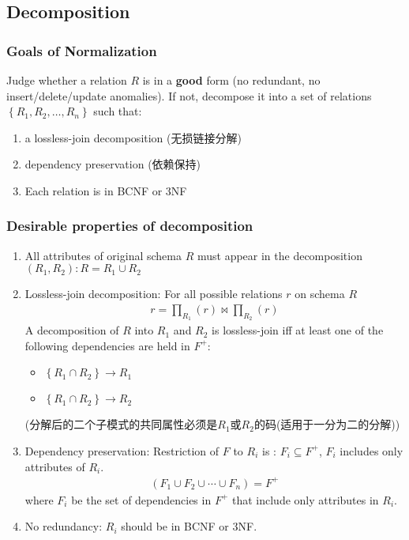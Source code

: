 \subsection{Decomposition}

\subsubsection{Goals of Normalization}
Judge whether a relation $R$ is in a \textbf{good} form (no redundant, no insert/delete/update anomalies). If not, decompose it into a set of relations $\left\{ R_1, R_2, \dots, R_n \right\}$ such that: 
\begin{enumerate}\small
    \item a lossless-join decomposition (无损链接分解)
    \item dependency preservation (依赖保持)
    \item Each relation is in BCNF or 3NF
\end{enumerate}

\subsubsection{Desirable properties of decomposition}
\begin{enumerate}
    \item All attributes of original schema $R$ must appear in the decomposition $(R_1, R_2): R=R_1\cup R_2$
    \item Lossless-join decomposition: For all possible relations $r$ on schema $R$
    \begin{align*}
        r=\prod_{R_1}(r)\bowtie \prod_{R_2} (r)
    \end{align*}
    A decomposition of $R$ into $R_1$ and $R_2$ is lossless-join iff at least one of the following dependencies are held in $F^+$:
    \begin{itemize}\small
        \item $\left\{ R_1\cap R_2 \right\} \rightarrow R_1$
        \item $\left\{ R_1\cap R_2 \right\} \rightarrow R_2$
    \end{itemize}
    (分解后的二个子模式的共同属性必须是$R_1$或$R_2$的码(适用于一分为二的分解))
    \item Dependency preservation: Restriction of $F$ to $R_i$ is : $F_i\subseteq F^+$, $F_i$ includes only attributes of $R_i$. 
    \begin{align*}
        (F_1\cup F_2\cup\cdots\cup F_n)=F^+
    \end{align*}
    where $F_i$ be the set of dependencies in $F^+$ that include only attributes in $R_i$. 
    \item No redundancy: $R_i$ should be in BCNF or 3NF. 
\end{enumerate}

